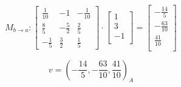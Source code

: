 \documentclass[11pt]{article}
\newenvironment{question}[1]
  {\par\addvspace{\medskipamount}
   \noindent\makebox[0pt][r]{\textbf{#1)} }\ignorespaces}
  {\par\addvspace{\medskipamount}}
\begin{document}
\begin{question}{1}
$$
M_{b \rightarrow a}:
\left[\begin{array}{rrr}
    \frac{1}{10} &-1 &-\frac{1}{10}\\
    \frac{8}{5} &-\frac{5}{2} &\frac{2}{5}\\
    -\frac{1}{5} &\frac{3}{2} &\frac{1}{5}
\end{array}\right]
\cdot
\left[\begin{array}{r}
    1\\
    3\\
    -1\\
\end{array}\right]
=
\left[\begin{array}{r}
    -\frac{14}{5}\\
    -\frac{63}{10}\\
    \frac{41}{10}\\
\end{array}\right]
$$

$$v=(-\frac{14}{5},-\frac{63}{10},\frac{41}{10})_A$$

\end{question}
\end{document}
